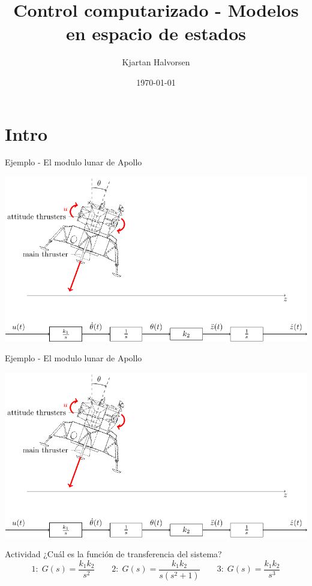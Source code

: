 \documentclass[presentation,aspectratio=1610]{beamer}
\author{Kjartan Halvorsen}
\date{\today}
\title{Control computarizado - Modelos en espacio de estados}
\begin{document}
\maketitle

\section{Intro}
\label{sec:org98e0d20}
\begin{frame}[label={sec:orgaf1f3ac}]{Ejemplo - El modulo lunar de Apollo}
\begin{center}
\includegraphics[width=\linewidth]{fig-apollo}
\end{center}
\end{frame}
\begin{frame}[label={sec:orge6377ae}]{Ejemplo - El modulo lunar de Apollo}
\begin{center}
\includegraphics[width=0.8\linewidth]{fig-apollo}
\end{center}
\alert{Actividad} ¿Cuál es la función de transferencia del sistema?
\[1: \; G(s) = \frac{k_1 k_2}{s^2}\qquad 2: \; G(s) = \frac{k_1 k_2}{s(s^2 + 1)} \qquad 3: \; G(s) = \frac{k_1 k_2}{s^3}\]
\end{frame}
\end{document}
